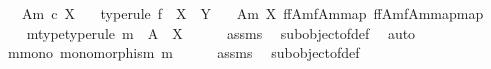 \begin{isabellebody}
\ \ \ {\isachardoublequoteopen}{\isacharparenleft}{\kern0pt}A{\isacharcomma}{\kern0pt}m{\isacharparenright}{\kern0pt}\ {\isasymsubseteq}\isactrlsub c\ X{\isachardoublequoteclose}\ \isanewline
\ \ type{\isacharunderscore}{\kern0pt}rule{\isacharbrackright}{\kern0pt}{\isacharcolon}{\kern0pt}\ {\isachardoublequoteopen}f\ {\isacharcolon}{\kern0pt}\ X\ {\isasymrightarrow}\ Y{\isachardoublequoteclose}\isanewline
\ \ \ {\isachardoublequoteopen}{\isacharparenleft}{\kern0pt}A{\isacharcomma}{\kern0pt}m{\isacharparenright}{\kern0pt}\ {\isasymsubseteq}\isactrlbsub X\isactrlesub \ {\isacharparenleft}{\kern0pt}f\isactrlsup {\isacharminus}{\kern0pt}f{\isasymlparr}A{\isasymrparr}\isactrlbsub m\isactrlesub {\isasymrparr}\isactrlbsub {\isacharbrackleft}{\kern0pt}f{\isasymlparr}A{\isasymrparr}\isactrlbsub m\isactrlesub {\isacharbrackright}{\kern0pt}map\isactrlesub {\isacharcomma}{\kern0pt}\ {\isacharbrackleft}{\kern0pt}f\isactrlsup {\isacharminus}{\kern0pt}f{\isasymlparr}A{\isasymrparr}\isactrlbsub m\isactrlesub {\isasymrparr}\isactrlbsub {\isacharbrackleft}{\kern0pt}f{\isasymlparr}A{\isasymrparr}\isactrlbsub m\isactrlesub {\isacharbrackright}{\kern0pt}map\isactrlesub {\isacharbrackright}{\kern0pt}map{\isacharparenright}{\kern0pt}{\isachardoublequoteclose}\isanewline
%
\isadelimproof
%
\endisadelimproof
%
\isatagproof
{}\isamarkupfalse%
\ {\isacharminus}{\kern0pt}\isanewline
\ \ \isamarkupfalse%
\ m{\isacharunderscore}{\kern0pt}type{\isacharbrackleft}{\kern0pt}type{\isacharunderscore}{\kern0pt}rule{\isacharbrackright}{\kern0pt}{\isacharcolon}{\kern0pt}\ {\isachardoublequoteopen}m\ {\isacharcolon}{\kern0pt}\ A\ {\isasymrightarrow}\ X{\isachardoublequoteclose}\isanewline
\ \ \ \ \isamarkupfalse%
\ assms{\isacharparenleft}{\kern0pt}{}{\isacharparenright}{\kern0pt}\ \isamarkupfalse%
\ subobject{\isacharunderscore}{\kern0pt}of{\isacharunderscore}{\kern0pt}def{}\ \isamarkupfalse%
\ auto\isanewline
\ \ \isamarkupfalse%
\ m{\isacharunderscore}{\kern0pt}mono{\isacharcolon}{\kern0pt}\ {\isachardoublequoteopen}monomorphism\ m{\isachardoublequoteclose}\isanewline
\ \ \ \ \isamarkupfalse%
\ assms{\isacharparenleft}{\kern0pt}{}{\isacharparenright}{\kern0pt}\ \isamarkupfalse%
\ subobject{\isacharunderscore}{\kern0pt}of{\isacharunderscore}{\kern0pt}def{}\ \isamarkupfalse%

\end{isabellebody}

